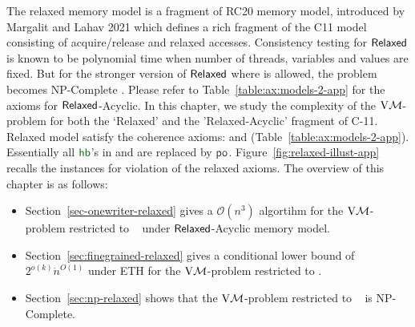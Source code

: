 \label{app:relaxed}

The relaxed memory model is a fragment of RC20 memory model,  introduced by Margalit and Lahav 2021 \cite{Margalit:2021} which defines a rich fragment of the C11 model consisting of acquire/release and relaxed accesses.  Consistency testing for $\mathsf{Relaxed}$ is known to be polynomial time when number of threads, variables and values are fixed. But for the stronger version of $\mathsf{Relaxed}$ where \PORF{} is allowed, the problem becomes NP-Complete \cite{ChakrabortyKMP24}. Please refer to Table~\ref{table:ax:models-2-app} for the axioms for $\mathsf{Relaxed}$-Acyclic. 
In this chapter, we study the complexity of the $\mathrm{V}\mathcal{M}$- problem for both the `Relaxed' and the 'Relaxed-Acyclic' fragment of C-11. Relaxed model satisfy the coherence axioms: \RlxRCoh{} and \RlxWCoh{}  (Table~\ref{table:ax:models-2-app}). Essentially all $\hb$'s in \WRCoh{} and \WCoh{} are replaced by $\po$.  Figure~\ref{fig:relaxed-illust-app} recalls the instances for violation of the relaxed axioms.     The overview of this chapter is as follows:
\begin{itemize}
 \item Section~\ref{sec-onewriter-relaxed} gives a  $\mathcal{O}(n^3)$ algortihm for the $\mathrm{V}\mathcal{M}$-problem restricted to  \onewriter~ under $\mathsf{Relaxed}$-Acyclic memory model.
 
 \item Section~\ref{sec:finegrained-relaxed} gives a conditional lower bound of $2^{o(k)}\dot n^{O(1)}$ under ETH for the $\mathrm{V}\mathcal{M}$-problem restricted to  \threewriter.
 
 \item Section~\ref{sec:np-relaxed} shows that the $\mathrm{V}\mathcal{M}$-problem restricted to \twowriter~ is NP-Complete.
\end{itemize}

